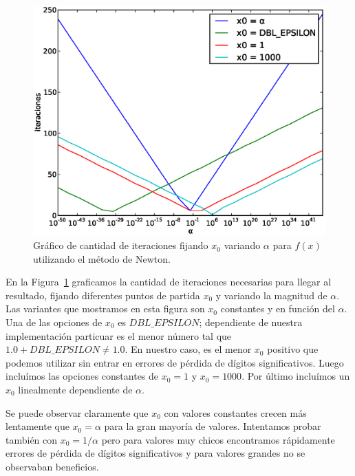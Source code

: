 \begin{figure}[!htbp]
  \begin{center}
    \includegraphics[scale=0.5]{graficos/new/f_newton_x0_fijo_1.eps}
    \caption{\label{fig:f_newton_x0_fijo_1} Gráfico de cantidad de iteraciones fijando $x_0$ variando $\alpha$ para $f(x)$ utilizando el método de Newton.}
  \end{center}
\end{figure}

En la Figura~\ref{fig:f_newton_x0_fijo_1} graficamos la cantidad de iteraciones
necesarias para llegar al resultado, fijando diferentes puntos de partida $x_0$
y variando la magnitud de $\alpha$. Las variantes que mostramos en esta figura
son $x_0$ constantes y en función del $\alpha$. Una de las opciones de $x_0$ es
$\textit{DBL\_EPSILON}$; dependiente de nuestra implementación particuar es el
menor número tal que $1.0 + \textit{DBL\_EPSILON} \ne 1.0$. En nuestro caso, es
el menor $x_0$ positivo que podemos utilizar sin entrar en errores de pérdida
de dígitos significativos. Luego incluímos las opciones constantes de $x_0 = 1$
y $x_0 = 1000$. Por último incluímos un $x_0$ linealmente dependiente de $\alpha$.

Se puede observar claramente que $x_0$ con valores constantes crecen más
lentamente que $x_0 = \alpha$ para la gran mayoría de valores. Intentamos
probar también con $x_0 = 1 / \alpha$ pero para valores muy chicos encontramos
rápidamente errores de pérdida de dígitos significativos y para valores grandes
no se observaban beneficios.

